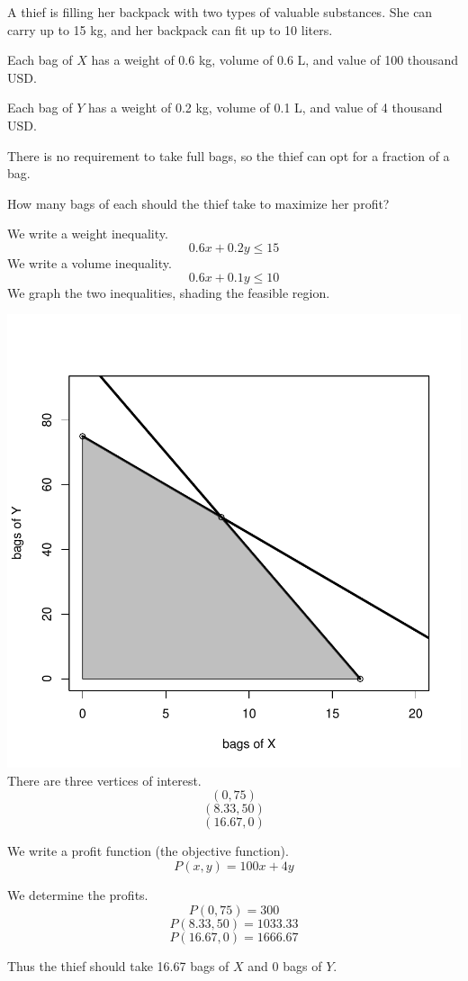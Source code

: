
\begin{question}
A thief is filling her backpack with two types of valuable substances.
She can carry up to 15 kg, and her backpack can fit up to 10 liters.

Each bag of \(X\) has a weight of 0.6 kg, volume of 0.6 L, and value of
100 thousand USD.

Each bag of \(Y\) has a weight of 0.2 kg, volume of 0.1 L, and value of
4 thousand USD.

There is no requirement to take full bags, so the thief can opt for a
fraction of a bag.

How many bags of each should the thief take to maximize her profit?
\end{question}

\begin{solution}
We write a weight inequality. \[0.6x+0.2y \le 15\] We write a volume
inequality. \[0.6x+0.1y \le 10\] We graph the two inequalities, shading
the feasible region.

\includegraphics{unnamed-chunk-1-1-4.pdf}\\

There are three vertices of interest. \[(0,75) \] \[(8.33,50) \]
\[(16.67,0)\]

We write a profit function (the objective function).
\[P(x,y) = 100x+4y \]

We determine the profits. \[P(0,75)=300 \] \[P(8.33,50)=1033.33 \]
\[P(16.67,0)=1666.67 \]

Thus the thief should take 16.67 bags of \(X\) and 0 bags of \(Y\).
\end{solution}

